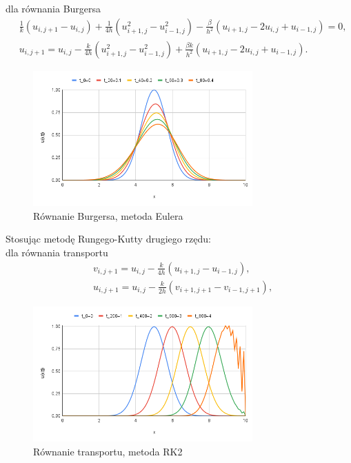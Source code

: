 \documentclass[12pt, a4paper]{article}
\begin{document}
dla równania Burgersa
\begin{equation}
\begin{split}
& \frac{1}{k}(u_{i,j+1}-u_{i,j})+\frac{1}{4h}(u_{i+1,j}^{2}-u_{i-1,j}^{2})-\frac{\beta}{h^{2}}(u_{i+1,j}-2u_{i,j}+u_{i-1,j})=0,\\
& u_{i,j+1}=u_{i,j}-\frac{k}{4h}(u_{i+1,j}^{2}-u_{i-1,j}^{2})+\frac{\beta k}{h^{2}}(u_{i+1,j}-2u_{i,j}+u_{i-1,j}).
\end{split}
\end{equation}
\begin{figure}[h]
\caption{Równanie Burgersa, metoda Eulera}
\centering
\includegraphics[width=0.75\textwidth]{3}
\end{figure}
\newpage

Stosując metodę Rungego-Kutty drugiego rzędu:\\
dla równania transportu
\begin{equation}
\begin{split}
& v_{i,j+1}=u_{i,j}-\frac{k}{4h}(u_{i+1,j}-u_{i-1,j}),\\
& u_{i,j+1}=u_{i,j}-\frac{k}{2h}(v_{i+1,j+1}-v_{i-1,j+1}),
\end{split}
\end{equation}
\begin{figure}[h]
\caption{Równanie transportu, metoda RK2}
\centering
\includegraphics[width=0.75\textwidth]{4}
\end{figure}
\end{document}
